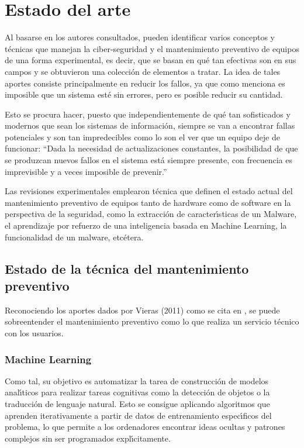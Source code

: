 \pagebreak
\section{Estado del arte}

Al basarse en los autores consultados, pueden identificar varios conceptos y
t\'ecnicas que manejan la ciber-seguridad y el mantenimiento preventivo de equipos
de una forma experimental, es decir, que se basan en qu\'e tan efectivas son en
sus campos y se obtuvieron una colecci\'on de elementos a tratar. La idea de
tales aportes consiste principalmente en reducir los fallos, ya que como
menciona \textcite{Rathore2023} es imposible que un sistema est\'e sin errores,
pero es posible reducir su cantidad.

Esto se procura hacer, puesto que independientemente de qu\'e tan sofisticados y
modernos que sean los sistemas de informaci\'on, siempre se van a encontrar fallas
potenciales y son tan impredecibles como lo son el ver que un equipo deje de
funcionar: ``Dada la necesidad de actualizaciones constantes, la posibilidad de
que se produzcan nuevos fallos en el sistema est\'a siempre presente, con
frecuencia es imprevisible y a veces imposible de prevenir.''
\parencite{Banja2020}

Las revisiones experimentales emplearon t\'ecnica que definen el estado actual
del mantenimiento preventivo de equipos tanto de hardware como de software en
la perspectiva de la seguridad, como la extracci\'on de caracter\'{\i}sticas de un
Malware, el aprendizaje por refuerzo de una inteligencia basada en Machine
Learning, la funcionalidad de un malware, etc\'etera.

\subsection{Estado de la t\'ecnica del mantenimiento preventivo}

Reconociendo los aportes dados por Vieras (2011) como
se cita en \cite{Zambrano2020}, se puede sobreentender el mantenimiento
preventivo como lo que realiza un servicio t\'ecnico con los usuarios.

\subsubsection{Machine Learning}

Como tal, su objetivo es automatizar la tarea de construcci\'on de modelos
anal\'{\i}ticos para realizar tareas cognitivas como la detecci\'on de objetos o la
traducci\'on de lenguaje natural. Esto se consigue aplicando algoritmos que
aprenden iterativamente a partir de datos de entrenamiento espec\'{\i}ficos del
problema, lo que permite a los ordenadores encontrar ideas ocultas y patrones
complejos sin ser programados expl\'{\i}citamente.
\parencite[Bishop, 2006  como se cita en][]{Janiesch2021}

